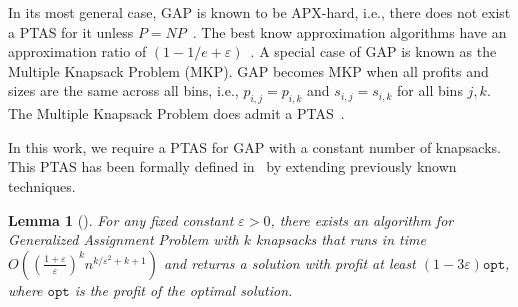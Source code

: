 \documentclass[10pt,a4paper]{amsart}
\newcommand{\akr}[1]{}
\newcommand{\eps}{\varepsilon}
\renewcommand{\epsilon}{\varepsilon} %
\newcommand{\AM}{\mathcal{A}}
\newtheorem{lemma}[theorem]{Lemma}
\theoremstyle{definition}
\newcommand{\opt}{\mathtt{opt}}
\begin{document}
In its most general case, GAP is known to be APX-hard, i.e., there does not exist a PTAS for it unless $P=NP$~\cite{ChekuriK05}. The best know approximation algorithms have an approximation ratio of $(1-1/e+\eps)$~\cite{FeigeV06,FleischerGMS11}. A special case of GAP is known as the Multiple Knapsack Problem (MKP). GAP becomes MKP when all profits and sizes are the same across all bins, i.e., $p_{i,j}=p_{i,k}$ and $s_{i,j}=s_{i,k}$ for all bins $j,k.$  The Multiple Knapsack Problem does admit a PTAS~\cite{ChekuriK05}. 

In this work, we require a PTAS for GAP with a constant number of knapsacks. This PTAS has been formally defined in~\cite{2dks-Lpacking} by extending previously known techniques.

\akr{added GAP theorem here.}
\begin{lemma}[\cite{2dks-Lpacking}]
    \label{lem:gap}
    For any fixed constant $\eps>0$, there exists an algorithm for Generalized Assignment Problem with $k$ knapsacks that runs in time $O((\frac{1+\eps}{\eps})^k n^{k/\eps^2+k+1})$ and returns a solution with profit at least $(1-3\eps)\opt$, where $\opt$ is the profit of the optimal solution. 
    
\end{lemma}


\end{document}
